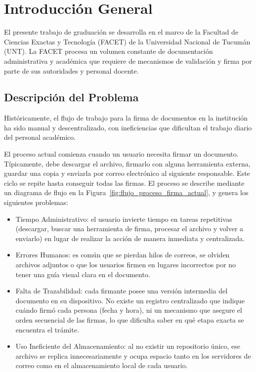 \chapter{Introducción General}
\label{chap:introduccion}

El presente trabajo de graduación se desarrolla en el marco de la Facultad de Ciencias Exactas y Tecnología (FACET) de la Universidad Nacional de Tucumán (UNT). La FACET procesa un volumen constante de documentación administrativa y académica que requiere de mecanismos de validación y firma por parte de sus autoridades y personal docente.

\section{Descripción del Problema}
\label{sec:problematica}

Históricamente, el flujo de trabajo para la firma de documentos en la institución ha sido manual y descentralizado, con ineficiencias que dificultan el trabajo diario del personal académico.

El proceso actual comienza cuando un usuario necesita firmar un documento. Típicamente, debe descargar el archivo, firmarlo con alguna herramienta externa, guardar una copia y enviarla por correo electrónico al siguiente responsable. Este ciclo se repite hasta conseguir todas las firmas. El proceso se describe mediante un diagrama de flujo en la Figura~\ref{fig:flujo_proceso_firma_actual}, y genera los siguientes problemas:

\begin{itemize}
    \item Tiempo Administrativo: el usuario invierte tiempo en tareas repetitivas (descargar, buscar una herramienta de firma, procesar el archivo y volver a enviarlo) en lugar de realizar la acción de manera inmediata y centralizada.
    \item Errores Humanos: es común que se pierdan hilos de correos, se olviden archivos adjuntos o que los usuarios firmen en lugares incorrectos por no tener una guía visual clara en el documento.
    \item Falta de Trazabilidad: cada firmante posee una versión intermedia del documento en su dispositivo. No existe un registro centralizado que indique cuándo firmó cada persona (fecha y hora), ni un mecanismo que asegure el orden secuencial de las firmas, lo que dificulta saber en qué etapa exacta se encuentra el trámite.
    \item Uso Ineficiente del Almacenamiento: al no existir un repositorio único, ese archivo se replica innecesariamente y ocupa espacio tanto en los servidores de correo como en el almacenamiento local de cada usuario.
\end{itemize}

